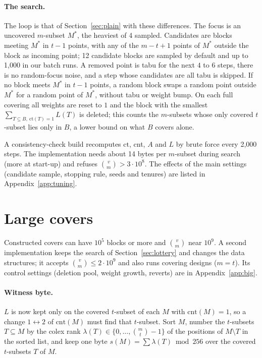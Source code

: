 \documentclass[11pt]{article}
\theoremstyle{remark}
\newcommand{\cov}{\mathrm{ct}}
\newcommand{\cnt}{\mathrm{cnt}}
\begin{document}
\paragraph{The search.} The loop is that of Section~\ref{sec:plain} with these differences. The focus is an uncovered
$m$-subset $M^\ast$, the heaviest of 4 sampled. Candidates are blocks meeting $M^\ast$ in $t-1$ points, with any of the
$m-t+1$ points of $M^\ast$ outside the block as incoming point; 12 candidate blocks are sampled by default and up to
1{,}000 in our batch runs. A removed point is tabu for the next $4$ to $6$ steps, there is no random-focus noise, and a step
whose candidates are all tabu is skipped. If no block meets $M^\ast$ in $t-1$ points, a random block swaps a random point
outside $M^\ast$ for a random point of $M^\ast$, without tabu or weight bump. On each full covering all weights are
reset to $1$ and the block with the smallest $\sum_{T\subseteq B,\ \cov(T)=1}L(T)$ is deleted; this counts the
$m$-subsets whose only covered $t$-subset lies only in $B$, a lower bound on what $B$ covers alone.

A consistency-check build recomputes $\cov$, cnt, $A$ and $L$ by brute force every 2{,}000 steps. The implementation
needs about 14 bytes per $m$-subset during search (more at start-up) and refuses $\binom{v}{m}>3\cdot 10^8$. The
effects of the main settings (candidate sample, stopping rule, seeds and tenures) are listed in
Appendix~\ref{app:tuning}.

\section{Large covers}\label{sec:big}

Constructed covers can have $10^5$ blocks or more and $\binom{v}{m}$ near $10^9$. A second implementation keeps the
search of Section~\ref{sec:lottery} and changes the data structures; it accepts $\binom{v}{m}\le 2\cdot 10^9$ and also
runs covering designs ($m=t$). Its control settings (deletion pool, weight growth, reverts) are in
Appendix~\ref{app:big}.

\paragraph{Witness byte.} $L$ is now kept only on the covered $t$-subset of each $M$ with $\cnt(M)=1$, so a change
$1\leftrightarrow 2$ of $\cnt(M)$ must find that $t$-subset. Sort $M$, number the $t$-subsets $T\subseteq M$ by the
colex rank $\lambda(T)\in\{0,\dots,\binom{m}{t}-1\}$ of the positions of $M\setminus T$ in the sorted list, and keep
one byte $s(M)=\sum\lambda(T)\bmod 256$ over the covered $t$-subsets $T$ of $M$.
\end{document}
